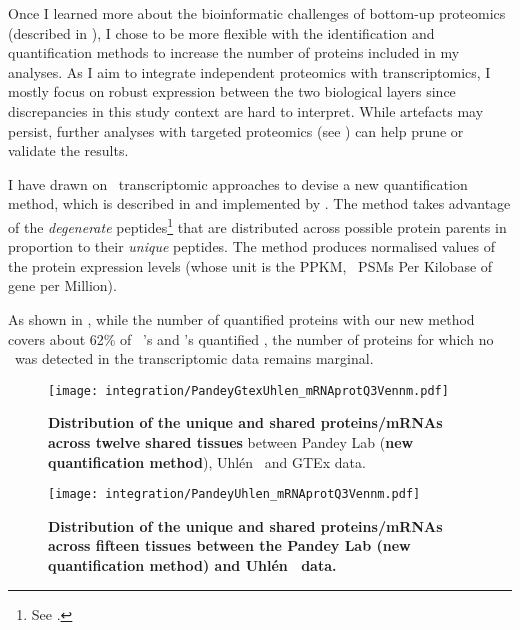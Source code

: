 Once I learned more about the bioinformatic challenges of bottom-up proteomics
(described in ),
I chose to be more flexible with the identification and quantification methods
to increase the number of proteins included in my analyses.
As I aim to integrate independent proteomics with transcriptomics,
I mostly focus on robust expression between the two biological layers
since discrepancies in this study context are hard to interpret.
While artefacts may persist,
further analyses with targeted proteomics (see )
can help prune or validate the results.\mybr\

I have drawn on \Rnaseq\ transcriptomic approaches to devise
a new quantification method, which is described in 
and implemented by \james.
The method takes advantage of the \emph{degenerate} peptides\footnote{%
See .}
that are distributed across possible protein parents
in proportion to their \emph{unique} peptides.
The method produces normalised values of the protein expression levels
(whose unit is the \gls{PPKM}, \ie\ \glspl{PSM} Per Kilobase of gene per Million).\mybr\

As shown in ,
while the number of quantified proteins
with our new method
covers about 62\% of \uhlen\ \etal{}'s and \gtex{}'s quantified \mRNAs,
the number of proteins for which no \mRNA\ was detected
in the transcriptomic data remains marginal.\mybr\

\begin{figure}[!htpb]
    \texttt{[image: integration/PandeyGtexUhlen\_mRNAprotQ3Vennm.pdf]}\centering
    \caption[Distribution of the unique and shared proteins/mRNAs
    across the three datasets and twelve tissues
    (new protein quantification method)]{\label{fig:PGU_venQ3}%
    \textbf{Distribution of the unique and shared proteins/mRNAs
    across twelve shared tissues} between  Pandey Lab
    (\textbf{new quantification method}),
    Uhlén \etal\ and GTEx data.}
\end{figure}

\begin{figure}[!htpb]
    \texttt{[image: integration/PandeyUhlen\_mRNAprotQ3Vennm.pdf]}\centering
    \caption[Distribution of the unique and shared proteins/mRNAs
    across fifteen tissues between Pandey Lab (new quantification method)
    and Uhlén \textit{et al.} data]{\label{fig:PU_vennQ3}\textbf{Distribution of the
    unique and shared proteins/mRNAs across fifteen tissues between
    the Pandey Lab (new quantification method)
    and Uhlén \etal\ data.}}
\end{figure}

